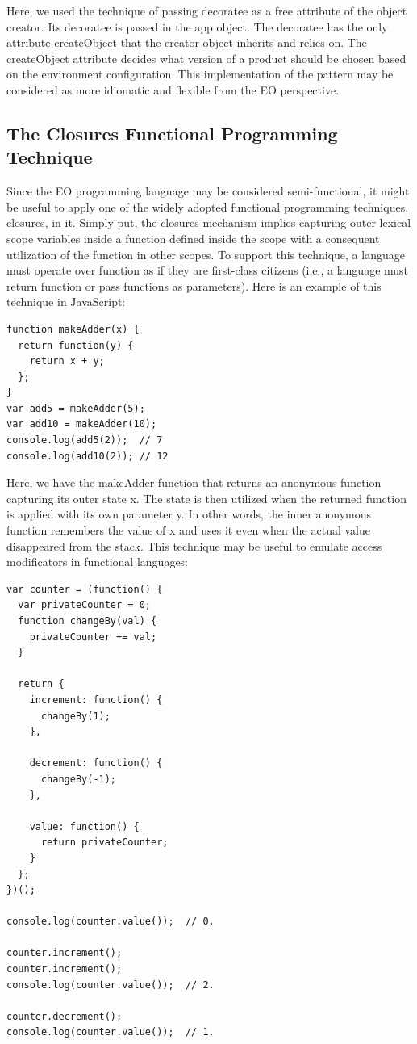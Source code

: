 \documentclass[sigplan,12pt,nonacm=true,review=false]{acmart}
\begin{document}
Here, we used the technique of passing decoratee as a free attribute of the object creator. Its decoratee is passed in the app object. The decoratee has the only attribute createObject that the creator object inherits and relies on. The createObject attribute decides what version of a product should be chosen based on the environment configuration. This implementation of the pattern may be considered as more idiomatic and flexible from the EO perspective.


\subsection{The Closures Functional Programming Technique}
Since the EO programming language may be considered semi-functional, it might be useful to apply one of the widely adopted functional programming techniques, closures, in it. Simply put, the closures mechanism implies capturing outer lexical scope variables inside a function defined inside the scope with a consequent utilization of the function in other scopes. To support this technique, a language must operate over function as if they are first-class citizens (i.e., a language must return function or pass functions as parameters). Here is an example of this technique in JavaScript:

\begin{verbatim}
function makeAdder(x) {
  return function(y) {
    return x + y;
  };
}
var add5 = makeAdder(5);
var add10 = makeAdder(10);
console.log(add5(2));  // 7
console.log(add10(2)); // 12
\end{verbatim}

Here, we have the makeAdder function that returns an anonymous function capturing its outer state x. The state is then utilized when the returned function is applied with its own parameter y. In other words, the inner anonymous function remembers the value of x and uses it even when the actual value disappeared from the stack. This technique may be useful to emulate access modificators in functional languages: 

\begin{verbatim}
var counter = (function() {
  var privateCounter = 0;
  function changeBy(val) {
    privateCounter += val;
  }

  return {
    increment: function() {
      changeBy(1);
    },

    decrement: function() {
      changeBy(-1);
    },

    value: function() {
      return privateCounter;
    }
  };
})();

console.log(counter.value());  // 0.

counter.increment();
counter.increment();
console.log(counter.value());  // 2.

counter.decrement();
console.log(counter.value());  // 1.
\end{verbatim}
\end{document}
